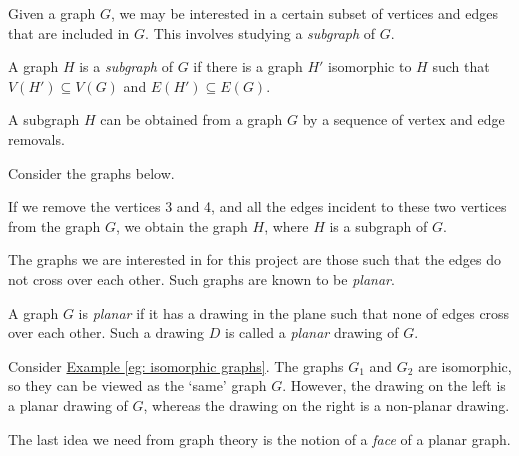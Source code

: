 \begin{flushleft}
Given a graph $G$, we may be interested in a certain subset of vertices and edges that are included in $G$. This involves studying a \textit{subgraph} of $G$.
\end{flushleft}

\begin{definition}
A graph $H$ is a \textit{subgraph} of $G$ if there is a graph $H'$ isomorphic to $H$ such that $V(H') \subseteq V(G)$ and $E(H') \subseteq E(G)$.
\end{definition}

\begin{flushleft}
A subgraph $H$ can be obtained from a graph $G$ by a sequence of vertex and edge removals.
\end{flushleft}

\begin{example}
Consider the graphs below.

\begin{figure}[ht]
    \centering
    
\end{figure}
\noindent
If we remove the vertices 3 and 4, and all the edges incident to these two vertices from the graph $G$, we obtain the graph $H$, where $H$ is a subgraph of $G$.
\end{example}

\begin{flushleft}
The graphs we are interested in for this project are those such that the edges do not cross over each other. Such graphs are known to be \textit{planar}.
\end{flushleft}

\begin{definition}
    \label{def: planar graphs}
    A graph $G$ is \textit{planar} if it has a drawing in the plane such that none of edges cross over each other. Such a drawing $D$ is called a \textit{planar} drawing of $G$.
\end{definition}

\begin{example}
    Consider \hyperref[eg: isomorphic graphs]{Example \ref*{eg: isomorphic graphs}}. The graphs $G_1$ and $G_2$ are isomorphic, so they can be viewed as the `same' graph $G$. However, the drawing on the left is a planar drawing of $G$, whereas the drawing on the right is a non-planar drawing.
\end{example}

\begin{flushleft}
The last idea we need from graph theory is the notion of a \textit{face} of a planar graph. 
\end{flushleft}


